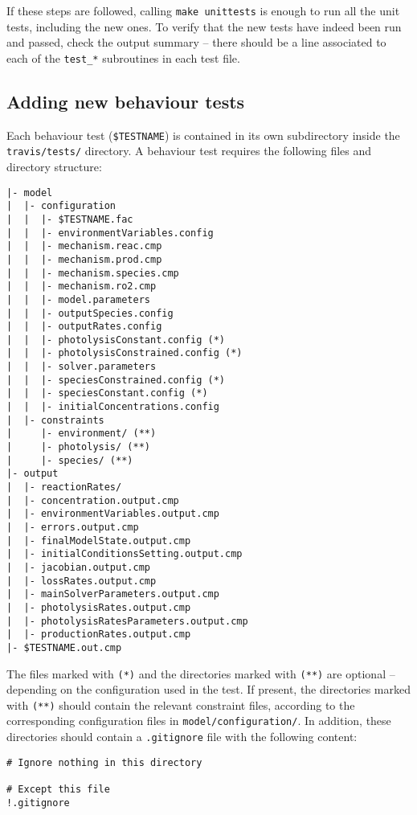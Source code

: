 If these steps are followed, calling \texttt{make\ unittests} is
enough to run all the unit tests, including the new ones. To verify
that the new tests have indeed been run and passed, check the output
summary -- there should be a line associated to each of the
\texttt{test\_*} subroutines in each test file.

\subsection{Adding new behaviour tests} \label{subsec:adding-new-behaviour-tests}

Each behaviour test (\texttt{\$TESTNAME}) is contained in its own
subdirectory inside the \texttt{travis/tests/} directory. A behaviour
test requires the following files and directory structure:

\begin{verbatim}
|- model
|  |- configuration
|  |  |- $TESTNAME.fac
|  |  |- environmentVariables.config
|  |  |- mechanism.reac.cmp
|  |  |- mechanism.prod.cmp
|  |  |- mechanism.species.cmp
|  |  |- mechanism.ro2.cmp
|  |  |- model.parameters
|  |  |- outputSpecies.config
|  |  |- outputRates.config
|  |  |- photolysisConstant.config (*)
|  |  |- photolysisConstrained.config (*)
|  |  |- solver.parameters
|  |  |- speciesConstrained.config (*)
|  |  |- speciesConstant.config (*)
|  |  |- initialConcentrations.config
|  |- constraints
|     |- environment/ (**)
|     |- photolysis/ (**)
|     |- species/ (**)
|- output
|  |- reactionRates/
|  |- concentration.output.cmp
|  |- environmentVariables.output.cmp
|  |- errors.output.cmp
|  |- finalModelState.output.cmp
|  |- initialConditionsSetting.output.cmp
|  |- jacobian.output.cmp
|  |- lossRates.output.cmp
|  |- mainSolverParameters.output.cmp
|  |- photolysisRates.output.cmp
|  |- photolysisRatesParameters.output.cmp
|  |- productionRates.output.cmp
|- $TESTNAME.out.cmp
\end{verbatim}

The files marked with \texttt{(*)} and the directories marked with
\texttt{(**)} are optional -- depending on the configuration used in
the test. If present, the directories marked with \texttt{(**)} should
contain the relevant constraint files, according to the corresponding
configuration files in \texttt{model/configuration/}. In addition,
these directories should contain a \texttt{.gitignore} file with the
following content:
\begin{verbatim}
# Ignore nothing in this directory

# Except this file
!.gitignore
\end{verbatim}

